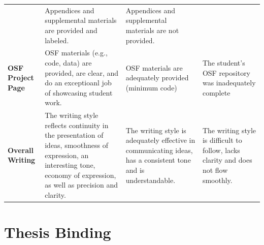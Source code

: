 \documentclass[
  openany]{book}
\begin{document}
\begin{longtable}[]{@{}llll@{}}
\begin{minipage}[t]{0.22\columnwidth}
\end{minipage} & \begin{minipage}[t]{0.22\columnwidth}\raggedright
Appendices and supplemental materials are provided and labeled.\strut
\end{minipage} & \begin{minipage}[t]{0.22\columnwidth}\raggedright
Appendices and supplemental materials are not provided.\strut
\end{minipage}\tabularnewline
\begin{minipage}[t]{0.22\columnwidth}\raggedright
\textbf{OSF Project Page}\strut
\end{minipage} & \begin{minipage}[t]{0.22\columnwidth}\raggedright
OSF materials (e.g., code, data) are provided, are clear, and do an exceptioanl job of showcasing student work.\strut
\end{minipage} & \begin{minipage}[t]{0.22\columnwidth}\raggedright
OSF materials are adequately provided (minimum code)\strut
\end{minipage} & \begin{minipage}[t]{0.22\columnwidth}\raggedright
The student's OSF repository was inadequately complete\strut
\end{minipage}\tabularnewline
\begin{minipage}[t]{0.22\columnwidth}\raggedright
\textbf{Overall Writing}\strut
\end{minipage} & \begin{minipage}[t]{0.22\columnwidth}\raggedright
The writing style reflects continuity in the presentation of ideas, smoothness of expression, an interesting tone, economy of expression, as well as precision and clarity.\strut
\end{minipage} & \begin{minipage}[t]{0.22\columnwidth}\raggedright
The writing style is adequately effective in communicating ideas, has a consistent tone and is understandable.\strut
\end{minipage} & \begin{minipage}[t]{0.22\columnwidth}\raggedright
The writing style is difficult to follow, lacks clarity and does not flow smoothly.\strut
\end{minipage}\tabularnewline
\bottomrule
\end{longtable}

\hypertarget{binding}{%
\chapter{Thesis Binding}\label{binding}}
\end{document}
